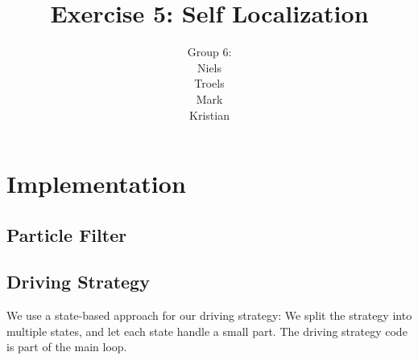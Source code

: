 \documentclass[a4paper,12pt]{article}
\title{Exercise 5: Self Localization}
\author{Group 6:\\Niels\\Troels\\Mark\\Kristian}
\begin{document}
\maketitle

\section{Implementation}

\subsection{Particle Filter}




\subsection{Driving Strategy}

We use a state-based approach for our driving strategy: We split the strategy
into multiple states, and let each state handle a small part.  The driving
strategy code is part of the main loop.
\end{document}

